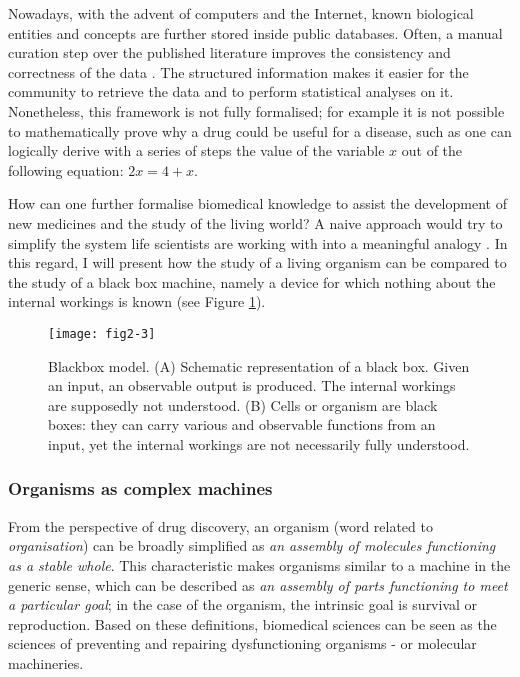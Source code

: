 Nowadays, with the advent of computers and the Internet, known biological entities and concepts are further stored inside public databases. Often, a manual curation step over the published literature improves the consistency and correctness of the data \citep{brooksbank2014european}. The structured information makes it easier for the community to retrieve the data and to perform statistical analyses on it. Nonetheless, this framework is not fully formalised; for example it is not possible to mathematically prove why a drug could be useful for a disease, such as one can logically derive with a series of steps the value of the variable $ x $ out of the following equation: $ 2x = 4 + x $.

How can one further formalise biomedical knowledge to assist the development of new medicines and the study of the living world? A naive approach would try to simplify the system life scientists are working with into a meaningful analogy \citep{lazebnik2002can}. In this regard, I will present how the study of a living organism can be compared to the study of a black box machine, namely a device for which nothing about the internal workings is known (see Figure \ref{fig2-3}).

\begin{figure}[ht]
    \centering
    \texttt{[image: fig2-3]}
    \caption{Blackbox model. (A) Schematic representation of a black box. Given an input, an observable output is produced. The internal workings are supposedly not understood. (B) Cells or organism are black boxes: they can carry various and observable functions from an input, yet the internal workings are not necessarily fully understood.}
    \label{fig2-3}
\end{figure}

\subsubsection{Organisms as complex machines}

From the perspective of drug discovery, an organism (word related to \emph{organisation}) can be broadly simplified as \emph{an assembly of molecules functioning as a stable whole}. This characteristic makes organisms similar to a machine in the generic sense, which can be described as \emph{an assembly of parts functioning to meet a particular goal}; in the case of the organism, the intrinsic goal is survival or reproduction. Based on these definitions, biomedical sciences can be seen as the sciences of preventing and repairing dysfunctioning organisms - or molecular machineries.

